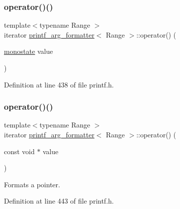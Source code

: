 \subsubsection{\texorpdfstring{operator()()}{operator()()}\hspace{0.1cm}{\footnotesize\ttfamily [6/8]}}
{\footnotesize\ttfamily template$<$typename Range $>$ \\
iterator \hyperlink{classprintf__arg__formatter}{printf\+\_\+arg\+\_\+formatter}$<$ Range $>$\+::operator() (\begin{DoxyParamCaption}\item[{\hyperlink{structmonostate}{monostate}}]{value }\end{DoxyParamCaption})\hspace{0.3cm}{\ttfamily [inline]}}



Definition at line 438 of file printf.\+h.

\mbox{\label{classprintf__arg__formatter_a22c7d349112400ecf9a66005b1a0229e}} 
\subsubsection{\texorpdfstring{operator()()}{operator()()}\hspace{0.1cm}{\footnotesize\ttfamily [7/8]}}
{\footnotesize\ttfamily template$<$typename Range $>$ \\
iterator \hyperlink{classprintf__arg__formatter}{printf\+\_\+arg\+\_\+formatter}$<$ Range $>$\+::operator() (\begin{DoxyParamCaption}\item[{const void $\ast$}]{value }\end{DoxyParamCaption})\hspace{0.3cm}{\ttfamily [inline]}}

Formats a pointer. 

Definition at line 443 of file printf.\+h.

\mbox{\label{classprintf__arg__formatter_a57ded50a248eab9775966e05330dfcb5}} 
